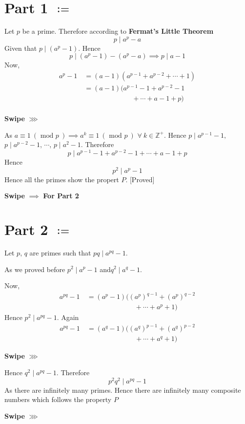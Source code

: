 \documentclass[12pt]{article}
\begin{document}
\pagebreak 
	
\Huge{\section{Part 1 $\boldsymbol{\coloneq}$}
Let $p $ be a prime. Therefore according to \textbf{Fermat's Little Theorem} $$p\mid a^p-a$$Given that $p\mid (a^p -1)$. Hence $$p\mid (a^p-1)-(a^p-a)\implies p\mid a-1$$Now,\begin{align*}
a^p-1\ & =(a-1)(a^{p-1}+a^{p-2}+\cdots+1)\\ 
& = (a-1)(a^{p-1}-1+a^{p-2}-1\\ 
& \qquad \qquad \qquad\quad +\cdots+a-1+p)\\ 
\end{align*}


\begin{flushright}
\textbf{Swipe }$\boldsymbol{\ggg}$
\end{flushright}

As $a\equiv 1\ (\text{ mod } p\ )\implies a^k\equiv 1\ (\text{ mod } p\ )$ $\forall\ k\in\mathbb{Z^+}$. Hence $p\mid a^{p-1}-1,$ $p\mid a^{p-2}-1$, $\cdots$, $p\mid a^{2}-1$. Therefore  $$p\mid a^{p-1}-1+a^{p-2}-1+\cdots+a-1+p$$Hence $$p^2\mid a^p-1$$Hence all the primes show the propert $P $. [Proved]
\vfill

\begin{center}
\textbf{Swipe }$\boldsymbol{\implies}$\textbf{ For Part 2}
\end{center}

\pagebreak 

\section{Part 2 $\boldsymbol{\coloneq}$}
Let $p $, $q $ are primes such that $pq\mid a^{pq}-1$.

As we proved before $p^2\mid a^p-1$ and\linebreak $q^2\mid a^q-1$. 

Now, \begin{align*}
a^{pq}-1\ & =(a^p-1)\big((a^{p})^{q-1}+(a^{p})^{q-2}\\ 
& \qquad \qquad \qquad\quad+ \cdots+a^p+1\big)
\end{align*}Hence $p^2\mid a^{pq}-1$. Again\begin{align*}
a^{pq}-1\ & =(a^q-1)\Big((a^{q})^{p-1}+(a^{q})^{p-2}\\ 
& \qquad \qquad \qquad\quad+ \cdots+a^q+1\Big)
\end{align*}

\begin{flushright}
\textbf{Swipe }$\boldsymbol{\ggg}$
\end{flushright}
Hence $q^2\mid a^{pq}-1$. Therefore $$p^2q^2\mid a^{pq}-1$$As there are infinitely many primes. Hence there are infinitely many composite numbers which follows the property $P$

\vfill

\begin{flushright}
\textbf{Swipe }$\boldsymbol{\ggg}$
\end{flushright}
}
\end{document}
